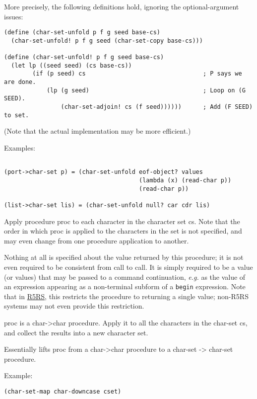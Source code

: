 \begin{description}
More precisely, the following definitions hold, ignoring the
optional-argument issues:

\begin{verbatim}
(define (char-set-unfold p f g seed base-cs) 
  (char-set-unfold! p f g seed (char-set-copy base-cs)))

(define (char-set-unfold! p f g seed base-cs)
  (let lp ((seed seed) (cs base-cs))
        (if (p seed) cs                                 ; P says we are done.
            (lp (g seed)                                ; Loop on (G SEED).
                (char-set-adjoin! cs (f seed))))))      ; Add (F SEED) to set.
\end{verbatim}

(Note that the actual implementation may be more efficient.)

Examples:

\begin{verbatim}
                         
(port->char-set p) = (char-set-unfold eof-object? values
                                      (lambda (x) (read-char p))
                                      (read-char p))

(list->char-set lis) = (char-set-unfold null? car cdr lis)
\end{verbatim}
\item[ \href{}{} \texttt{char-set-for-each} proc cs -\textgreater{}
unspecified ]
Apply procedure proc to each character in the character set cs. Note
that the order in which proc is applied to the characters in the set is
not specified, and may even change from one procedure application to
another.

Nothing at all is specified about the value returned by this procedure;
it is not even required to be consistent from call to call. It is simply
required to be a value (or values) that may be passed to a command
continuation, \emph{e.g.} as the value of an expression appearing as a
non-terminal subform of a \texttt{begin} expression. Note that in
\protect\hyperlink{R5RS}{R5RS}, this restricts the procedure to
returning a single value; non-R5RS systems may not even provide this
restriction.
\item[ \href{}{} \texttt{char-set-map} proc cs -\textgreater{} char-set
]
proc is a char-\textgreater{}char procedure. Apply it to all the
characters in the char-set cs, and collect the results into a new
character set.

Essentially lifts proc from a char-\textgreater{}char procedure to a
char-set -\textgreater{} char-set procedure.

Example:

\begin{verbatim}
(char-set-map char-downcase cset)
\end{verbatim}
\end{description}


